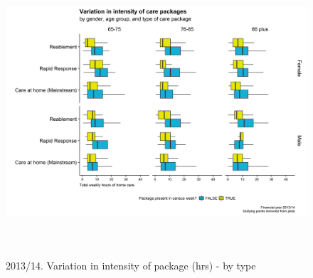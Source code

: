 \documentclass[]{article}
\begin{document}
\begin{figure}[]
  \centering
    \caption{2013/14. Variation in intensity of package (hrs) - by type}
    \includegraphics[height = 10cm, width = 12cm]{figures/chapter-renf/09-intensity-type.png}
    \label{fig:renf-intensity-type}
\end{figure}
\end{document}
